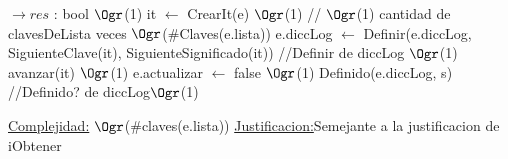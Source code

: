 \begin{Representacion}
\begin{Algoritmos}
\begin{algorithm}[H]
		\begin{algorithmic}[1]
			 $\to res$ : bool
			 \Comment $\Ogr$(1)
			\State it $\leftarrow$ CrearIt(e) \Comment $\Ogr$(1)
			 // $\Ogr$(1) cantidad de clavesDeLista veces \Comment $\Ogr$($\#$Claves(e.lista))
			\State e.diccLog $\leftarrow$ Definir(e.diccLog, SiguienteClave(it), SiguienteSignificado(it)) //Definir de diccLog \Comment $\Ogr$(1) 
			\State avanzar(it) \Comment $\Ogr$(1) 
			\EndWhile
			\State e.actualizar $\leftarrow$ false \Comment $\Ogr$(1) 
			\EndIf
			\State Definido(e.diccLog, s) //Definido? de diccLog$\Ogr$(1)
			\EndProcedure
		\end{algorithmic}
		\underline{Complejidad:} $\Ogr$($\#$claves(e.lista))
		\underline{Justificacion:}Semejante a la justificacion de iObtener
		
	\end{algorithm}

\end{Algoritmos}
\end{Representacion}